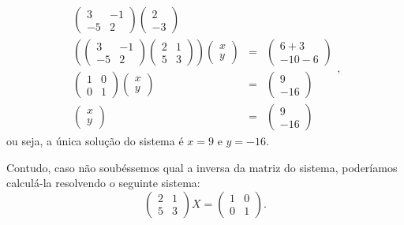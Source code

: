 \documentclass[a4paper,12pt]{article}
\newenvironment{sol}{\begin{tcolorbox}[breakable,colback=blue!5!white,colframe=blue!40!white,title=\normalsize {\sc{Solução}},coltitle=black]}{\end{tcolorbox}}
\begin{document}
\begin{sol}
\[\begin{array}{rcl}
\begin{pmatrix}
	3&-1\\-5&2
	\end{pmatrix}\begin{pmatrix}
	2\\-3
	\end{pmatrix}\\ \left(
	\begin{pmatrix}
	3&-1\\-5&2
	\end{pmatrix}\begin{pmatrix}
	2&1\\5&3
	\end{pmatrix}\right)\begin{pmatrix}
	x\\y
	\end{pmatrix}&=&\begin{pmatrix}
	6+3\\-10-6
	\end{pmatrix}\\\begin{pmatrix}
	1&0\\0&1
	\end{pmatrix}\begin{pmatrix}
	x\\y
	\end{pmatrix}&=&\begin{pmatrix}
	9\\-16
	\end{pmatrix}\\\begin{pmatrix}
	x\\y
	\end{pmatrix}&=&\begin{pmatrix}
	9\\-16
	\end{pmatrix}
	\end{array},\] ou seja, a única solução do sistema é $x=9$ e $y=-16$.
	
	Contudo, caso não soubéssemos qual a inversa da matriz do sistema, poderíamos calculá-la resolvendo o seguinte sistema:
	\[\begin{pmatrix}
	2&1\\5&3
	\end{pmatrix}X=\begin{pmatrix}
	1&0\\0&1
	\end{pmatrix}.\]
	

\end{sol}
\end{document}
